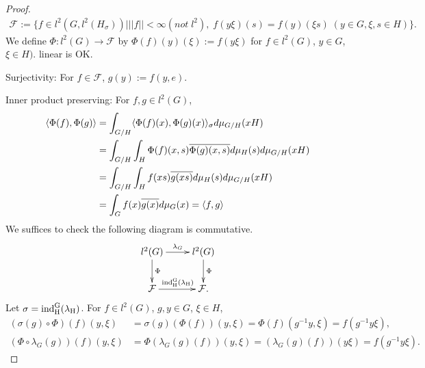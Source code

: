 \begin{proof}
  \begin{align*}
    \mathcal{F} := \{f \in l^2(G,l^2(H_\sigma)) | ||f|| < \infty (not \; l^2) ,\; f(y\xi)(s) = f(y)(\xi s) \;(y \in G, \xi,s \in H)\}.
  \end{align*}
  We define $\Phi : l^2(G) \rightarrow \mathcal{F}$ by $\Phi(f)(y)(\xi) := f(y\xi)$ for $f \in l^2(G)$, $y \in G$, $\xi \in H)$.
  linear is OK.

  Surjectivity: For $f \in \mathcal{F}$, $g(y):= f(y,e)$.

  Inner product preserving: For $f, g \in l^2(G)$,
  \begin{align*}
    \langle\Phi(f),\Phi(g)\rangle &= \int_{G/H} \langle\Phi(f)(x),\Phi(g)(x)\rangle_\sigma d \mu_{G/H}(xH)\\
    &=\int_{G/H} \int_H \Phi(f)(x,s) \overline{\Phi(g)(x,s)} d\mu_H(s)d\mu_{G/H}(xH)\\
    &=\int_{G/H} \int_H f(xs) \overline{g(xs)} d\mu_H(s)d\mu_{G/H}(xH)\\
    &=\int_Gf(x)\overline{g(x)}d\mu_G(x) = \langle f,g\rangle
  \end{align*}
  We suffices to check the following diagram is commutative.
  \[
  \xymatrix{
    l^2(G) \ar[r]^{\lambda_G} \ar[d]^{\Phi}& l^2(G) \ar[d]^{\Phi} \\
    \mathcal{F} \ar[r]^{\ind_H^G(\lambda_H)} & \mathcal{F}.
  }
  \]
  Let $\sigma = \rm{ind}_H^G(\lambda_H)$.
  For $f \in l^2(G)$, $g, y \in G$, $\xi \in H$,
  \begin{align*}
    (\sigma(g) \circ \Phi)(f)(y, \xi) &= \sigma(g)( \Phi(f)) (y,\xi) = \Phi(f)(g^{-1}y,\xi) = f(g^{-1}y\xi),\\
    (\Phi \circ \lambda_G(g))(f)(y,\xi) &= \Phi(\lambda_G(g)(f))(y,\xi) = (\lambda_G(g)(f))(y\xi) = f(g^{-1}y\xi).
  \end{align*}
\end{proof}
